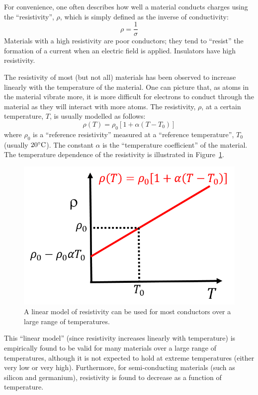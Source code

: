 For convenience, one often describes how well a material conducts charges using the ``resistivity'', $\rho$, which is simply defined as the inverse of conductivity:
\begin{equation}
\rho = \frac{1}{\sigma}
\end{equation}
Materials with a high resistivity are poor conductors; they tend to ``resist'' the formation of a current when an electric field is applied. Insulators have high resistivity.

The resistivity of most (but not all) materials has been observed to increase linearly with the temperature of the material. One can picture that, as atoms in the material vibrate more, it is more difficult for electrons to conduct through the material as they will interact with more atoms. The resistivity, $\rho$, at a certain temperature, $T$, is usually modelled as follows:
\begin{equation}
\rho(T)=\rho_0\left[ 1 + \alpha (T-T_0)\right]
\end{equation}
where $\rho_0$ is a ``reference resistivity'' measured at a ``reference temperature'', $T_0$ (usually $20 {\rm \degree C}$). The constant $\alpha$ is the ``temperature coefficient'' of the material. The temperature dependence of the resistivity is illustrated in Figure~\ref{fig:current:resistivity}.

\begin{figure}[!htbp]
\centering
\includegraphics[width=0.4\linewidth]{files/resistivity-c7aafb366a6b3b1ed6353f119b1917bd.png}
\caption[]{A linear model of resistivity can be used for most conductors over a large range of temperatures.}
\label{fig:current:resistivity}
\end{figure}

This ``linear model'' (since resistivity increases linearly with temperature) is empirically found to be valid for many materials over a large range of temperatures, although it is not expected to hold at extreme temperatures (either very low or very high). Furthermore, for semi-conducting materials (such as silicon and germanium), resistivity is found to decrease as a function of temperature.

